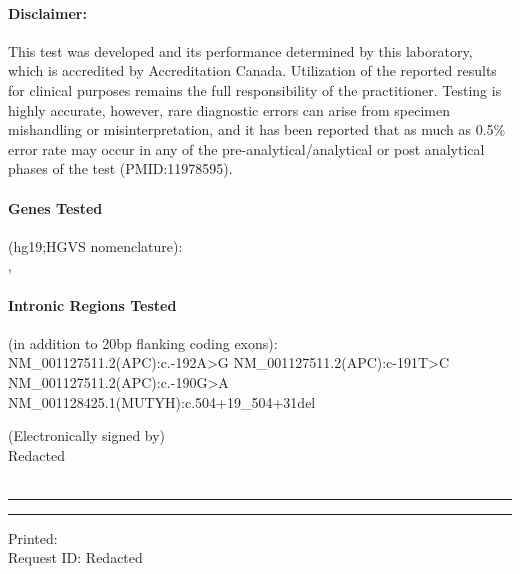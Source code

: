 \documentclass[9pt]{extarticle}
\newcommand{\data}[1]{}
\newenvironment{dataiter}[1]{}{}
\begin{document}
\paragraph{Disclaimer:} This test was developed and its performance determined by this laboratory, which is accredited by Accreditation Canada. Utilization of the reported results for clinical purposes remains the full responsibility of the practitioner. Testing is highly accurate, however, rare diagnostic errors can arise from specimen mishandling or misinterpretation, and it has been reported that as much as 0.5\% error rate may occur in any of the pre-analytical/analytical or post analytical phases of the test (PMID:11978595).

\paragraph{Genes Tested} (hg19;HGVS nomenclature): \\
\begin{dataiter}{tested_genes}\data{gene_symbol}, \end{dataiter}

\paragraph{Intronic Regions Tested} (in addition to 20bp flanking coding exons): \\
NM\_001127511.2(APC):c.-192A>G
NM\_001127511.2(APC):c-191T>C
NM\_001127511.2(APC):c.-190G>A
NM\_001128425.1(MUTYH):c.504+19\_504+31del
\vspace{1em}

(Electronically signed by) \\
Redacted \\
\data{date_verified} \\

\vspace{1em}
\hrule
\vspace{1pt}
\hrule
\vspace{1em}

Printed: \data{date_verified}\\
Request ID: Redacted
\end{document}
